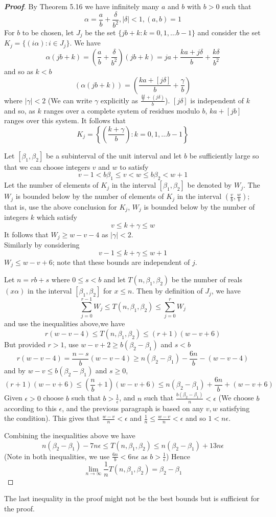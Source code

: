 \begin{proof}[\bf Proof] By Theorem 5.16 we have infinitely many $a$ and $b$ with $b>0$ such that
$$\alpha=\frac{a}{b}+\frac{\delta}{b^2}, |\delta|<1,(a,b)=1$$
For $b$ to be chosen, let $J_j$ be the set $\{jb+k:k=0,1,\ldots b-1\}$ and
consider the set $K_j=\{(i\alpha): i \in J_j\}$. We have
$$\alpha(jb+k)=\left(\frac{a}{b}+\frac{\delta}{b^2}\right)(jb+k)=ja+\frac{ka+j\delta}{b}
+\frac{k\delta}{b^2}$$
and so as $k<b$
$$(\alpha(jb+k))=\left(\frac{ka+[j\delta]}{b}+\frac{\gamma}{b}\right)$$
where $|\gamma|<2$ (We can write $\gamma$ explicitly as
$\frac{\frac{k\delta}{b}+(j\delta)}{b}$).
$[j\delta]$ is independent of $k$ and so, as $k$ ranges over a complete system of residues modulo $b$, $ka+[jb]$ ranges over this system. It follows that
$$K_j=\left\{\left(\frac{k+\gamma}{b}\right): k=0,1,\ldots b-1\right\}$$

Let $[\beta_1,\beta_2]$ be a subinterval of the unit interval and let $b$ be sufficiently large so that
we can choose integers $v$ and $w$ to satisfy
$$v-1<b\beta_1\le v <w \le b\beta_2 <w+1$$
Let the number of elements of $K_j$ in the interval $[\beta_1,\beta_2]$ be denoted by
$W_j$. The $W_j$ is bounded below by the number of elements of $K_j$ in the interval
$(\frac{v}{b},\frac{w}{b})$; that is, use the above conclusion for $K_j$,
 $W_j$ is bounded below by the number of integers $k$ which satisfy
$$v \le k+\gamma \le w$$
It follows that $W_j \ge w-v-4$ as $|\gamma| <2$. \\
Similarly by considering
$$v-1 \le k+\gamma \le w+1$$
$W_j \le w-v+6$; note that
these bounds are independent of $j$.

Let $n=rb+s$ where $0 \le s <b$ and let $T(n,\beta_1,\beta_2)$ be the number of
reals $(x\alpha)$ in the interval $[\beta_1,\beta_2]$ for $x \le n$.
Then by definition of $J_j$, we have
$$\sum_{j=0}^{r-1}W_j \le T(n,\beta_1,\beta_2) \le \sum_{j=0}^{r}W_j$$
and use the inequalities above,we have
$$r(w-v-4) \le T(n,\beta_1,\beta_2) \le (r+1)(w-v+6)$$
But provided $r>1$, use $w-v+2 \ge b(\beta_2-\beta_1)$ and $s<b$
$$r(w-v-4)=\frac{n-s}{b}(w-v-4)\ge n(\beta_2-\beta_1)-\frac{6n}{b}-(w-v-4)$$
and by $w-v \le b(\beta_2-\beta_1)$ and $s \ge 0$,
$$(r+1)(w-v+6)\le \left(\frac{n}{b}+1\right)(w-v+6)\le n(\beta_2-\beta_1)+\frac{6n}{b}+(w-v+6)$$
Given $\epsilon>0$ choose $b$ such that $b>\frac{1}{\epsilon}$, and $n$ such that
$\frac{b(\beta_2-\beta_1)}{n}<\epsilon$ (We choose $b$ according to this $\epsilon$, and the previous paragraph is based
on any $v,w$ satisfying the condition).
This gives that $\frac{w-v}{n} <\epsilon$ and
$\frac{1}{n}\le \frac{w-v}{n}<\epsilon$ and so $1<n\epsilon$.

Combining the inequalities above we have
$$n(\beta_2-\beta_1)-7n\epsilon \le T(n,\beta_1,\beta_2) \le n(\beta_2-\beta_1)+13n\epsilon$$
(Note in both inequalities, we use $\frac{6n}{b}<6n\epsilon$ as $b>\frac{1}{\epsilon}$)
Hence
$$\lim_{n \to \infty}\frac{1}{n} T(n,\beta_1,\beta_2)=\beta_2-\beta_1$$
\end{proof}
\begin{remark} The last inequality in the proof might not be the best bounds but is sufficient for the proof.
\end{remark}

